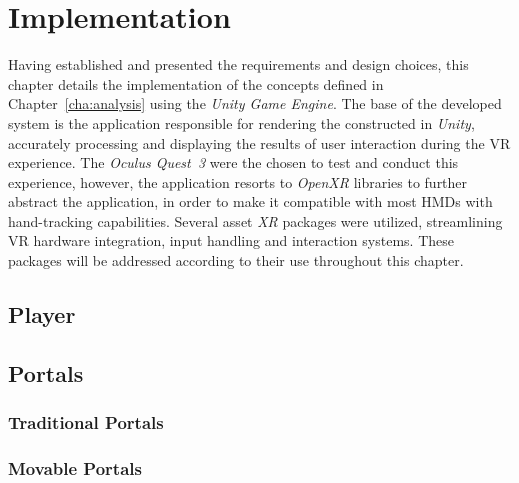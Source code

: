 
%

\chapter{Implementation}
\label{cha:implementation}

Having established and presented the requirements and design choices, this chapter details the implementation of the concepts 
defined in Chapter~\ref{cha:analysis} using the \textit{Unity Game Engine}. The base of the developed system is the  application 
responsible for rendering the  constructed in \textit{Unity}, accurately processing and displaying the results of user 
interaction during the \gls{VR} experience. The \textit{Oculus Quest~3} were the chosen  to test and conduct this experience, 
however, the application resorts to \textit{OpenXR} libraries to further abstract the application, in order to make it compatible with most 
\glspl{HMD} with hand-tracking capabilities. Several asset \textit{XR} packages were utilized, streamlining \gls{VR} hardware integration, 
input handling and interaction systems. These packages will be addressed according to their use throughout this chapter.


\section{Player}
\label{sec:player}

\section{Portals}
\label{sec:portals}

\subsection{Traditional Portals}
\label{sec:trad-portals}

\subsection{Movable Portals}
\label{sec:mov-portals}

